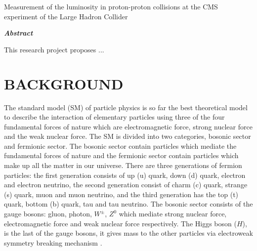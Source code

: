 \documentclass[final,3p]{CSP}
\def\ProjectTitle{Measurement of the luminosity in proton-proton collisions at the CMS experiment of the Large Hadron Collider}
\begin{document}
\begin{adjustwidth}{1cm}{1cm}

  \begin{center}
    {\Large \ProjectTitle \par}
    \vspace{1cm}
    {\itshape\textbf{Abstract}\par}
  \end{center}
  
  \vspace{1 cm}
 
  
  \onehalfspacing
  This research project proposes ...

\end{adjustwidth}

\hspace{2pt}
\vfill

\newpage
\section{BACKGROUND}


\onehalfspacing
The standard model (SM) of particle physics is so far the best theoretical model to describe the interaction of elementary particles using three of the four fundamental forces of nature which are electromagnetic force, strong nuclear force and the weak nuclear force.
The SM is divided into two categories, bosonic sector and fermionic sector.
The bosonic sector contain particles which mediate the fundamental forces of  nature and the fermionic sector contain particles which make up all the matter in our universe.
There are three generations of fermion particles: the first generation consists of up (u) quark, down (d) quark, electron and electron neutrino, the second generation consist of charm (c) quark, strange (s) quark, muon and muon neutrino, and the third generation has the top (t) quark, bottom (b) quark, tau and tau neutrino.
The bosonic sector consists of the gauge bosons: gluon, photon, $W^{\pm}$, $Z^0$ which mediate strong nuclear force, electromagnetic force and weak nuclear force respectively.
The Higgs boson ($H$), is the last of the gauge bosons, it gives mass to the other particles via electroweak symmetry breaking mechanism \cite{Chatrchyan:2012xdj}.
\end{document}
